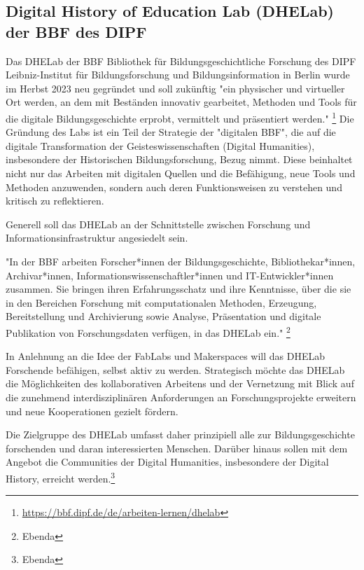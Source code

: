 \documentclass[a4paper,
fontsize=11pt,
oneside,
numbers=noperiodatend,
parskip=half-,
bibliography=totoc,
final
]{scrartcl}
\begin{document}
\hypertarget{digital-history-of-education-lab-dhelab-der-bbf-des-dipf}{%
\subsection{Digital History of Education Lab (DHELab) der BBF des
DIPF}\label{digital-history-of-education-lab-dhelab-der-bbf-des-dipf}}

Das DHELab der BBF \textbar{} Bibliothek für Bildungsgeschichtliche
Forschung des DIPF \textbar{} Leibniz-Institut für Bildungsforschung und
Bildungsinformation in Berlin wurde im Herbst 2023 neu gegründet und
soll zukünftig "ein physischer und virtueller Ort werden, an dem mit
Beständen innovativ gearbeitet, Methoden und Tools für die digitale
Bildungsgeschichte erprobt, vermittelt und präsentiert werden."
\footnote{\url{https://bbf.dipf.de/de/arbeiten-lernen/dhelab}} Die
Gründung des Labs ist ein Teil der Strategie der "digitalen BBF", die
auf die digitale Transformation der Geisteswissenschaften (Digital
Humanities), insbesondere der Historischen Bildungsforschung, Bezug
nimmt. Diese beinhaltet nicht nur das Arbeiten mit digitalen Quellen und
die Befähigung, neue Tools und Methoden anzuwenden, sondern auch deren
Funktionsweisen zu verstehen und kritisch zu reflektieren.

Generell soll das DHELab an der Schnittstelle zwischen Forschung und
Informationsinfrastruktur angesiedelt sein.

"In der BBF arbeiten Forscher*innen der Bildungsgeschichte,
Bibliothekar*innen, Archivar*innen, Informationswissenschaftler*innen
und IT-Entwickler*innen zusammen. Sie bringen ihren Erfahrungsschatz und
ihre Kenntnisse, über die sie in den Bereichen Forschung mit
computationalen Methoden, Erzeugung, Bereitstellung und Archivierung
sowie Analyse, Präsentation und digitale Publikation von Forschungsdaten
verfügen, in das DHELab ein." \footnote{Ebenda}

In Anlehnung an die Idee der FabLabs und Makerspaces will das DHELab
Forschende befähigen, selbst aktiv zu werden. Strategisch möchte das
DHELab die Möglichkeiten des kollaborativen Arbeitens und der Vernetzung
mit Blick auf die zunehmend interdisziplinären Anforderungen an
Forschungsprojekte erweitern und neue Kooperationen gezielt fördern.

Die Zielgruppe des DHELab umfasst daher prinzipiell alle zur
Bildungsgeschichte forschenden und daran interessierten Menschen.
Darüber hinaus sollen mit dem Angebot die Communities der Digital
Humanities, insbesondere der Digital History, erreicht
werden.\footnote{Ebenda}
\end{document}
